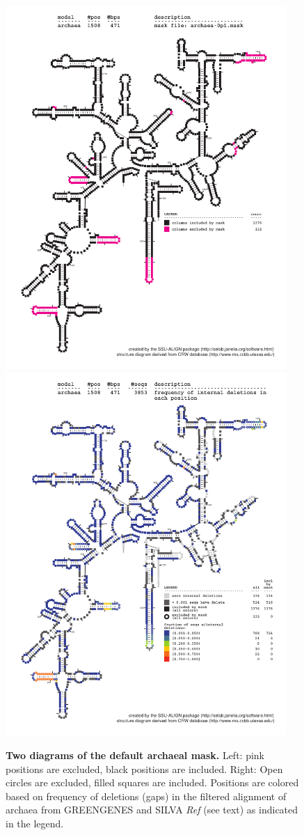 \begin{figure}
  \begin{center}
\includegraphics[width=4.2in]{Figures/archaea-0p1-mask}
\includegraphics[width=4.2in]{Figures/archaea-ggsilR-dint-wmask}
  \end{center}
\caption{\textbf{Two diagrams of the default archaeal mask.} Left: pink positions are excluded,
  black positions are included. Right: Open circles are excluded,
  filled squares are included. Positions are colored based on
  frequency of deletions (gaps) in the filtered alignment of archaea
  from GREENGENES and SILVA \emph{Ref} (see text) as
  indicated in the legend.}
\label{fig:mask-arc}
\end{figure}


